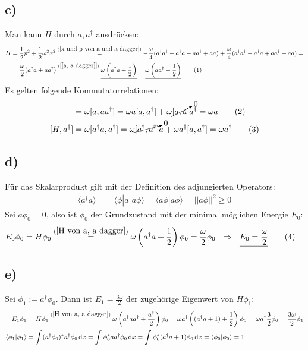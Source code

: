 \documentclass[a4paper,12pt]{article}
\newcommand\numberthis{\addtocounter{equation}{1}\tag{\theequation}}
\newcommand{\bra}{}
\newcommand{\brak}{}
\newcommand{\intx}{}
\newcommand{\kla}{}
\begin{document}
\subsection*{c)}
Man kann $H$ durch $a, a^\dagger$ ausdrücken:
\begin{align*}
H&=\frac{1}{2}p^2+\frac{1}{2}\omega^2x^2\overset{(\ref{x und p von a und a dagger})}{=}-\frac{\omega}{4}(a^\dagger a^\dagger -a^\dagger a-aa^\dagger +aa)+\frac{\omega}{4}(a^\dagger a^\dagger+a^\dagger a+aa^\dagger +aa)= \\
&=\frac{\omega}{2}(a^\dagger a+aa^\dagger)\overset{(\ref{[a, a dagger]})}{=}\underline{\omega\kla\left( { a^\dagger a +\frac{1}{2}} \right)}=\underline{\omega\kla\left( { aa^\dagger -\frac{1}{2}} \right)} \numberthis\label{H von a, a dagger}
\end{align*}
Es gelten folgende Kommutatorrelationen:
\begin{align*}
[a,H]&=\omega [a, aa^\dagger]=\omega a[a,a^\dagger]+\omega\cancelto{0}{[a,a]}a^\dagger =\omega a \numberthis\label{[a, H]}\\
[H,a^\dagger]&=\omega [a^\dagger a,a^\dagger]=\omega\cancelto{0}{[a^\dagger,a^\dagger]}a+\omega a^\dagger [a,a^\dagger]=\omega a^\dagger \numberthis\label{[h, a dagger]}
\end{align*}
\subsection*{d)}
Für das Skalarprodukt gilt mit der Definition des adjungierten Operators:
\begin{align*}
\bra\langle {a^\dagger a}\rangle&=\brak\langle {\phi}| {a^\dagger a\phi}\rangle=\brak\langle {a\phi}| {a\phi}\rangle=||a\phi||^2\ge 0
\end{align*}
Sei $a\phi_0=0$, also ist $\phi_0$ der Grundzustand mit der minimal möglichen Energie $E_0$:
\begin{align*}
E_0\phi_0&=H\phi_0\overset{(\ref{H von a, a dagger})}{=}\omega\kla\left( {a^\dagger a+\frac{1}{2}} \right)\phi_0=\frac{\omega}{2}\phi_0\ \ \Rightarrow\ \ \underline{E_0=\frac{\omega}{2}} \numberthis\label{E_0} 
\end{align*}
\subsection*{e)}
Sei $\phi_1:=a^\dagger \phi_0$. Dann ist $E_1=\frac{3\omega}{2}$ der zugehörige Eigenwert von $H\phi_1$:
\begin{align*}
E_1\phi_1&=H\phi_1\overset{(\ref{H von a, a dagger})}{=}\omega\kla\left( {a^\dagger aa^\dagger +\frac{a^\dagger}{2}} \right)\phi_0=\omega a^\dagger\kla\left( {(a^\dagger a +1)+\frac{1}{2}} \right)\phi_0=\omega a^\dagger \frac{3}{2}\phi_0=\frac{3\omega}{2}\phi_1\\
\brak\langle {\phi_1}| {\phi_1}\rangle &=\intx\int_{ }^{ }(a^\dagger\phi_0)^\ast a^\dagger\phi_0\,\mathrm{d}x=\intx\int_{ }^{ }\phi_0^\ast aa^\dagger\phi_0\,\mathrm{d}x=\intx\int_{ }^{ }\phi_0^\ast (a^\dagger a+1)\phi_0\,\mathrm{d}x=\brak\langle {\phi_0}| {\phi_0}\rangle=1
\end{align*}
\end{document}
